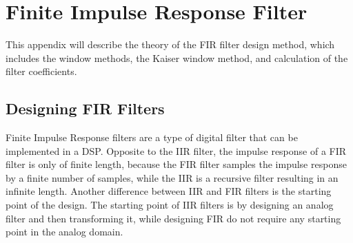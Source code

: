 \chapter{Finite Impulse Response Filter} \label{app:FIR_theory}
This appendix will describe the theory of the FIR filter design method, which includes the window methods, the Kaiser window method, and calculation of the filter coefficients.

\section{Designing FIR Filters}

Finite Impulse Response filters are a type of digital filter that can be implemented in a DSP. Opposite to the IIR filter, the impulse response of a FIR filter is only of finite length, because the FIR filter samples the impulse response by a finite number of samples, while the IIR is a recursive filter resulting in an infinite length. Another difference between IIR and FIR filters is the starting point of the design. The starting point of IIR filters is by designing an analog filter and then transforming it, while designing FIR do not require any starting point in the analog domain.

